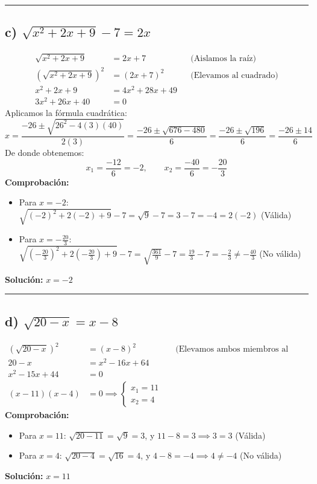 \documentclass{article}
\begin{document}
\hrule

\subsection*{c) $\sqrt{x^2 + 2x + 9} - 7 = 2x$}
\begin{align*}
\sqrt{x^2 + 2x + 9} &= 2x + 7 && \text{(Aislamos la raíz)} \\
\left(\sqrt{x^2 + 2x + 9}\right)^2 &= (2x + 7)^2 && \text{(Elevamos al cuadrado)} \\
x^2 + 2x + 9 &= 4x^2 + 28x + 49 \\
3x^2 + 26x + 40 &= 0
\end{align*}
Aplicamos la fórmula cuadrática:
\[
x = \frac{-26 \pm \sqrt{26^2 - 4(3)(40)}}{2(3)} = \frac{-26 \pm \sqrt{676 - 480}}{6} = \frac{-26 \pm \sqrt{196}}{6} = \frac{-26 \pm 14}{6}
\]
De donde obtenemos:
\[
x_1 = \frac{-12}{6} = -2, \qquad x_2 = \frac{-40}{6} = -\frac{20}{3}
\]
\textbf{Comprobación:}
\begin{itemize}
    \item Para $x = -2$: $\sqrt{(-2)^2 + 2(-2) + 9} - 7 = \sqrt{9} - 7 = 3 - 7 = -4 = 2(-2)$ (Válida)
    \item Para $x = -\frac{20}{3}$: $\sqrt{\left(-\frac{20}{3}\right)^2 + 2\left(-\frac{20}{3}\right) + 9} - 7 = \sqrt{\frac{361}{9}} - 7 = \frac{19}{3} - 7 = -\frac{2}{3} \neq -\frac{40}{3}$ (No válida)
\end{itemize}
\textbf{Solución:} $x = -2$

\hrule

\subsection*{d) $\sqrt{20 - x} = x - 8$}
\begin{align*}
\left(\sqrt{20 - x}\right)^2 &= (x - 8)^2 && \text{(Elevamos ambos miembros al cuadrado)} \\
20 - x &= x^2 - 16x + 64 \\
x^2 - 15x + 44 &= 0 \\
(x - 11)(x - 4) &= 0 \implies 
\begin{cases} 
x_1 = 11 \\ 
x_2 = 4 
\end{cases}
\end{align*}
\textbf{Comprobación:}
\begin{itemize}
    \item Para $x = 11$: $\sqrt{20 - 11} = \sqrt{9} = 3$, y $11 - 8 = 3 \implies 3 = 3$ (Válida)
    \item Para $x = 4$: $\sqrt{20 - 4} = \sqrt{16} = 4$, y $4 - 8 = -4 \implies 4 \neq -4$ (No válida)
\end{itemize}
\textbf{Solución:} $x = 11$
\end{document}
